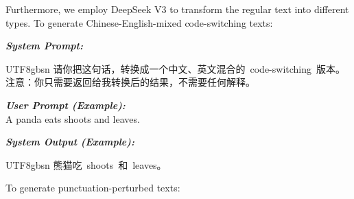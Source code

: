 \documentclass[11pt]{article}
\begin{document}
Furthermore, we employ DeepSeek V3 to transform the regular text into different types. To generate Chinese-English-mixed code-switching texts:

\begin{promptbox}
\textit{\textbf{System Prompt:} }\\
\begin{CJK*}{UTF8}{gbsn}
    请你把这句话，转换成一个中文、英文混合的~code-switching~版本。注意：你只需要返回给我转换后的结果，不需要任何解释。
\end{CJK*}

\medskip \textit{\textbf{User Prompt (Example):} }\\
A panda eats shoots and leaves.

\medskip \textit{\textbf{System Output (Example):} }\\
\begin{CJK*}{UTF8}{gbsn}
    熊猫吃~shoots~和~leaves。
\end{CJK*}

\end{promptbox}

To generate punctuation-perturbed texts:
\end{document}
